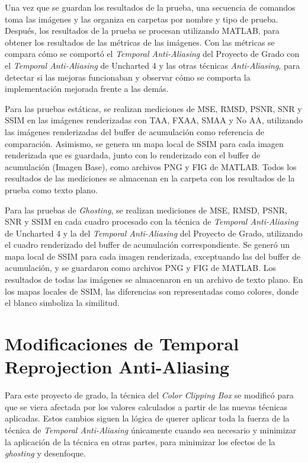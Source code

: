 \documentclass[pregrado]{tesis-usb} %
\begin{document}
Una vez que se guardan los resultados de la prueba, una secuencia de comandos toma las imágenes y las organiza en carpetas por nombre y tipo de prueba. Después, los resultados de la prueba se procesan utilizando MATLAB, para obtener los resultados de las métricas de las imágenes. Con las métricas se compara cómo se comportó el \textit{Temporal Anti-Aliasing} del Proyecto de Grado con el \textit{Temporal Anti-Aliasing} de Uncharted 4 y las otras técnicas \textit{Anti-Aliasing}, para detectar si las mejoras funcionaban y observar cómo se comporta la implementación mejorada frente a las demás.

Para las pruebas estáticas, se realizan mediciones de MSE, RMSD, PSNR, SNR y SSIM en las imágenes renderizadas con TAA, FXAA, SMAA y No AA, utilizando las imágenes renderizadas del buffer de acumulación como referencia de comparación. Asimismo, se genera un mapa local de SSIM para cada imagen renderizada que es guardada, junto con lo renderizado con el buffer de acumulación (Imagen Base), como archivos PNG y FIG de MATLAB. Todos los resultados de las mediciones se almacenan en la carpeta con los resultados de la prueba como texto plano.

Para las pruebas de \textit{Ghosting}, se realizan mediciones de MSE, RMSD, PSNR, SNR y SSIM en cada cuadro procesado con la técnica de \textit{Temporal Anti-Aliasing} de Uncharted 4 y la del \textit{Temporal Anti-Aliasing} del Proyecto de Grado, utilizando el cuadro renderizado del buffer de acumulación correspondiente. Se generó un mapa local de SSIM para cada imagen renderizada, exceptuando las del buffer de acumulación, y se guardaron como archivos PNG y FIG de MATLAB. Los resultados de todas las imágenes se almacenaron en un archivo de texto plano. En los mapas locales de SSIM, las diferencias son representadas como colores, donde el blanco simboliza la similitud.


\section[Modificaciones de Temporal Reprojection Anti-Aliasing ]{Modificaciones de Temporal Reprojection Anti-Aliasing }
Para este proyecto de grado, la técnica del \textit{Color Clipping Box} se modificó para que se viera afectada por los valores calculados a partir de las nuevas técnicas aplicadas. Estos cambios siguen la lógica de querer aplicar toda la fuerza de la técnica de \textit{Temporal Anti-Aliasing} únicamente cuando sea necesario y minimizar la aplicación de la técnica en otras partes, para minimizar los efectos de la \textit{ghosting} y desenfoque.
\end{document}
